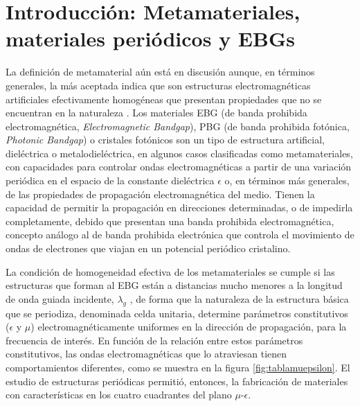 
\section{Introducción: Metamateriales, materiales periódicos y EBGs}
\label{sec_resenia_metamateriales}


La definición de metamaterial aún está en discusión aunque, en términos generales, la más aceptada indica que son estructuras electromagnéticas artificiales efectivamente homogéneas que presentan propiedades que no se encuentran en la naturaleza \cite{Caloz:ElectromagneticMetamaterials}. Los materiales EBG (de banda prohibida electromagnética, \textit{Electromagnetic Bandgap}), PBG (de banda prohibida fotónica, \textit{Photonic Bandgap}) o cristales fotónicos son un tipo de estructura artificial, dieléctrica o metalodieléctrica, en algunos casos clasificadas como metamateriales, con capacidades para controlar ondas electromagnéticas \cite{Engheta:Metamaterials} a partir de una variación periódica en el espacio de la constante dieléctrica $\epsilon$ o, en términos más generales, de las propiedades de propagación electromagnética del medio. Tienen la capacidad de permitir la propagación en direcciones determinadas, o de impedirla completamente, debido que presentan una banda prohibida electromagnética, concepto análogo al de banda prohibida electrónica que controla el movimiento de ondas de electrones que viajan en un potencial periódico cristalino.

La condición de homogeneidad efectiva de los metamateriales se cumple si las estructuras que forman al EBG están a distancias mucho menores a la longitud de onda guiada incidente, $\lambda_g$ \cite{Caloz:ElectromagneticMetamaterials}, de forma que la naturaleza de la estructura básica que se periodiza, denominada celda unitaria, determine parámetros constitutivos ($\epsilon$ y $\mu$) electromagnéticamente uniformes en la dirección de propagación, para la frecuencia de interés. En función de la relación entre estos parámetros constitutivos, las ondas electromagnéticas que lo atraviesan tienen comportamientos diferentes, como se muestra en la figura \ref{fig:tablamuepsilon}. El estudio de estructuras periódicas permitió, entonces, la fabricación de materiales con características en los cuatro cuadrantes del plano $\mu$-$\epsilon$.

